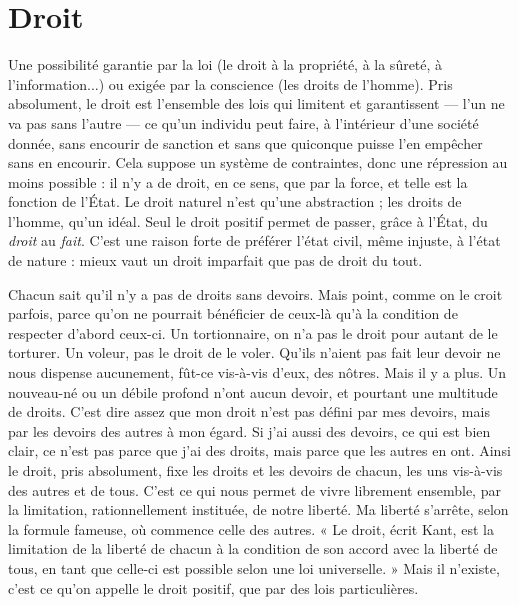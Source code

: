 \section{Droit}
Une possibilité garantie par la loi (le droit à la propriété, à la sûreté,
à l'information...) ou exigée par la conscience (les droits de
l’homme). Pris absolument, le droit est l’ensemble des lois qui limitent et
garantissent — l’un ne va pas sans l’autre — ce qu’un individu peut faire, à l’intérieur
d’une société donnée, sans encourir de sanction et sans que quiconque
puisse l’en empêcher sans en encourir. Cela suppose un système de contraintes,
donc une répression au moins possible : il n’y a de droit, en ce sens, que par la
force, et telle est la fonction de l’État. Le droit naturel n’est qu’une abstraction ;
les droits de l’homme, qu’un idéal. Seul le droit positif permet de passer, grâce
à l’État, du {\it droit} au {\it fait}. C’est une raison forte de préférer l’état civil, même
injuste, à l’état de nature : mieux vaut un droit imparfait que pas de droit du
tout.

Chacun sait qu’il n’y a pas de droits sans devoirs. Mais point, comme on le
croit parfois, parce qu’on ne pourrait bénéficier de ceux-là qu’à la condition de
respecter d’abord ceux-ci. Un tortionnaire, on n’a pas le droit pour autant de le
torturer. Un voleur, pas le droit de le voler. Qu'ils n’aient pas fait leur devoir
ne nous dispense aucunement, fût-ce vis-à-vis d’eux, des nôtres. Mais il y a
plus. Un nouveau-né ou un débile profond n’ont aucun devoir, et pourtant
une multitude de droits. C’est dire assez que mon droit n’est pas défini par mes
devoirs, mais par les devoirs des autres à mon égard. Si j’ai aussi des devoirs, ce
qui est bien clair, ce n’est pas parce que j’ai des droits, mais parce que les autres
en ont. Ainsi le droit, pris absolument, fixe les droits et les devoirs de chacun,
les uns vis-à-vis des autres et de tous. C’est ce qui nous permet de vivre librement
ensemble, par la limitation, rationnellement instituée, de notre liberté.
Ma liberté s'arrête, selon la formule fameuse, où commence celle des autres.
« Le droit, écrit Kant, est la limitation de la liberté de chacun à la condition de
son accord avec la liberté de tous, en tant que celle-ci est possible selon une loi
universelle. » Mais il n’existe, c’est ce qu’on appelle le droit positif, que par des
lois particulières.

